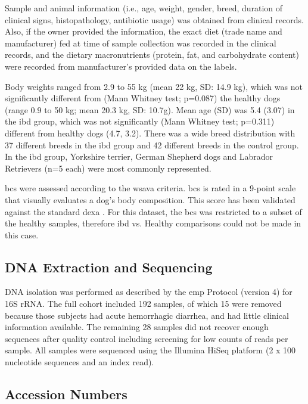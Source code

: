 Sample and animal information (i.e., age, weight, gender, breed, duration of 
clinical signs, histopathology, antibiotic usage) was obtained from clinical 
records. Also, if the owner provided the information, the exact diet (trade 
name and manufacturer) fed at time of sample collection was recorded in the 
clinical records, and the dietary macronutrients (protein, fat, and 
carbohydrate content) were recorded from manufacturer's provided data on the 
labels.

Body weights ranged from 2.9 to 55 kg (mean 22 kg, SD: 14.9 kg), which was not 
significantly different from (Mann Whitney test; p=0.087) the healthy dogs 
(range 0.9 to 50 kg; mean 20.3 kg, SD: 10.7g). Mean age (SD) was 5.4 (3.07) in 
the \gls{ibd} group, which was not significantly (Mann Whitney test; p=0.311) 
different from healthy dogs (4.7, 3.2). There was a wide breed distribution 
with 37 different breeds in the \gls{ibd} group and 42 different breeds in the 
control group. In the \gls{ibd} group, Yorkshire terrier, German Shepherd dogs 
and Labrador Retrievers (n=5 each) were most commonly represented.

\Gls{bcs} were assessed according to the \gls{wsava} criteria. \Gls{bcs} is 
rated in a 9-point scale that visually evaluates a dog's body composition. This 
score has been validated against the standard \gls{dexa} \cite{RN4000}. For 
this dataset, the \Gls{bcs} was restricted to a subset of the healthy samples, 
therefore \gls{ibd} vs. Healthy comparisons could not be made in this case.

\subsection{DNA Extraction and Sequencing}

DNA isolation was performed as described by the \gls{emp} Protocol (version 
4) for 16S rRNA\cite{RN164}. The full cohort included 192 
samples, of which 15 were removed because those subjects had acute hemorrhagic 
diarrhea, and had little clinical information available.  The remaining 28 
samples did not recover enough sequences after quality control including 
screening for low counts of reads per sample. All samples were sequenced using 
the Illumina HiSeq platform (2 x 100 nucleotide sequences and an index read).

\subsection{Accession Numbers}

